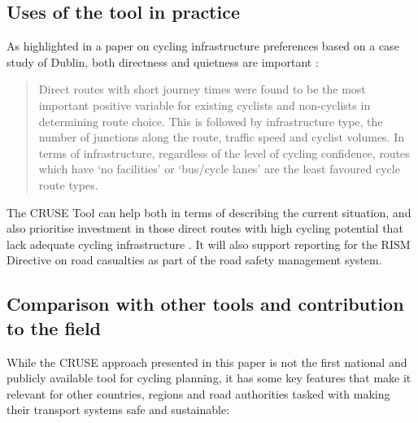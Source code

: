 \documentclass[
  super,
  preprint,
  3p]{elsarticle}
\begin{document}
\subsection{Uses of the tool in
practice}\label{uses-of-the-tool-in-practice}

As highlighted in a paper on cycling infrastructure preferences based on
a case study of Dublin, both directness and quietness are important
\citep{caulfield2012}:

\begin{quote}
Direct routes with short journey times were found to be the most
important positive variable for existing cyclists and non-cyclists in
determining route choice. This is followed by infrastructure type, the
number of junctions along the route, traffic speed and cyclist volumes.
In terms of infrastructure, regardless of the level of cycling
confidence, routes which have `no facilities' or `bus/cycle lanes' are
the least favoured cycle route types.
\end{quote}

The CRUSE Tool can help both in terms of describing the current
situation, and also prioritise investment in those direct routes with
high cycling potential that lack adequate cycling infrastructure
\citep{caulfield2012}. It will also support reporting for the RISM
Directive on road casualties as part of the road safety management
system.

\subsection{Comparison with other tools and contribution to the
field}\label{comparison-with-other-tools-and-contribution-to-the-field}

While the CRUSE approach presented in this paper is not the first
national and publicly available tool for cycling planning, it has some
key features that make it relevant for other countries, regions and road
authorities tasked with making their transport systems safe and
sustainable:
\end{document}
